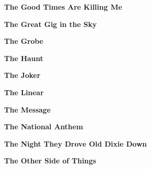 \vspace{10pt} 
\begin{center}\textbf{The Good Times Are Killing Me}\end{center}
\newline
\vspace{10pt} 
\begin{center}\textbf{The Great Gig in the Sky}\end{center}
\newline
\vspace{10pt} 
\begin{center}\textbf{The Grobe}\end{center}
\newline
\vspace{10pt} 
\begin{center}\textbf{The Haunt}\end{center}
\newline
\vspace{10pt} 
\begin{center}\textbf{The Joker}\end{center}
\newline
\vspace{10pt} 
\begin{center}\textbf{The Linear}\end{center}
\newline
\vspace{10pt} 
\begin{center}\textbf{The Message}\end{center}
\newline
\vspace{10pt} 
\begin{center}\textbf{The National Anthem}\end{center}
\newline
\vspace{10pt} 
\begin{center}\textbf{The Night They Drove Old Dixie Down}\end{center}
\newline
\vspace{10pt} 
\begin{center}\textbf{The Other Side of Things}\end{center}
